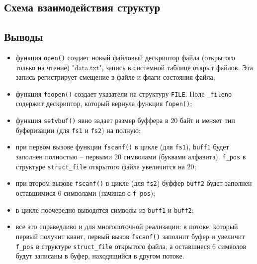 \subsection{Схема взаимодействия структур}


\subsection*{Выводы}

\begin{itemize}
	\item функция \texttt{open()} создает новый файловый дескриптор файла (открытого только на чтение) "data.txt"{}, запись в системной таблице открыт файлов. Эта запись регистрирует смещение в файле и флаги состояния файла;
	
	\item функция \texttt{fdopen()} создает указатели на структуру \texttt{FILE}. Поле \texttt{\_fileno} содержит дескриптор, который вернула функция \texttt{fopen()};
	
	\item функция \texttt{setvbuf()} явно задает размер буффера в 20 байт и меняет тип буферизации (для \texttt{fs1} и \texttt{fs2}) на полную;
	
	\item при первом вызове функции \texttt{fscanf()} в цикле (для \texttt{fs1}), \texttt{buff1} будет заполнен полностью -- первыми 20 символами (буквами алфавита). \texttt{f\_pos} в структуре \texttt{struct\_file} открытого файла увеличится на 20;
	
	\item при втором вызове \texttt{fscanf()} в цикле (для \texttt{fs2}) буффер \texttt{buff2} будет заполнен оставшимися 6 символами (начиная с \texttt{f\_pos});
	
	\item в цикле поочередно выводятся символы из \texttt{buff1} и \texttt{buff2};
	
	\item все это справедливо и для многопоточной реализации: в потоке, который первый получит квант, первый вызов \texttt{fscanf()} заполнит буфер и увеличит \texttt{f\_pos} в структуре \texttt{struct\_file} открытого файла, а оставшиеся 6 символов будут записаны в буфер, находящийся в другом потоке.
\end{itemize}


